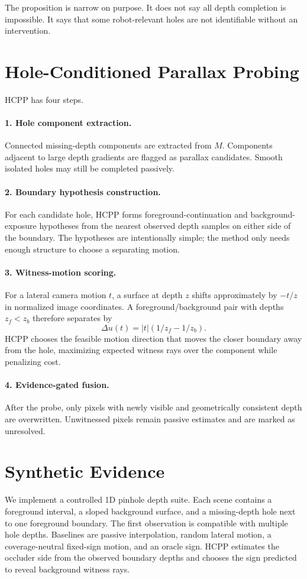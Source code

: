 \documentclass{article}
\begin{document}
The proposition is narrow on purpose. It does not say all depth completion is impossible. It says that some robot-relevant holes are not identifiable without an intervention.

\section{Hole-Conditioned Parallax Probing}
HCPP has four steps.
\paragraph{1. Hole component extraction.}
Connected missing-depth components are extracted from $M$. Components adjacent to large depth gradients are flagged as parallax candidates. Smooth isolated holes may still be completed passively.

\paragraph{2. Boundary hypothesis construction.}
For each candidate hole, HCPP forms foreground-continuation and background-exposure hypotheses from the nearest observed depth samples on either side of the boundary. The hypotheses are intentionally simple; the method only needs enough structure to choose a separating motion.

\paragraph{3. Witness-motion scoring.}
For a lateral camera motion $t$, a surface at depth $z$ shifts approximately by $-t/z$ in normalized image coordinates. A foreground/background pair with depths $z_f<z_b$ therefore separates by
\begin{equation}
\Delta u(t)=|t|(1/z_f-1/z_b).
\end{equation}
HCPP chooses the feasible motion direction that moves the closer boundary away from the hole, maximizing expected witness rays over the component while penalizing cost.

\paragraph{4. Evidence-gated fusion.}
After the probe, only pixels with newly visible and geometrically consistent depth are overwritten. Unwitnessed pixels remain passive estimates and are marked as unresolved.

\section{Synthetic Evidence}
We implement a controlled 1D pinhole depth suite. Each scene contains a foreground interval, a sloped background surface, and a missing-depth hole next to one foreground boundary. The first observation is compatible with multiple hole depths. Baselines are passive interpolation, random lateral motion, a coverage-neutral fixed-sign motion, and an oracle sign. HCPP estimates the occluder side from the observed boundary depths and chooses the sign predicted to reveal background witness rays.
\end{document}
